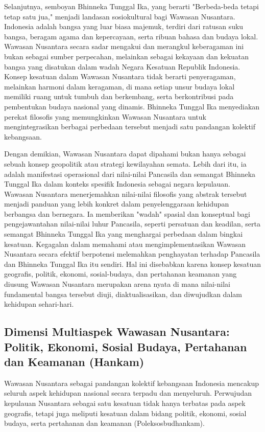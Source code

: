 \documentclass[12pt, a4paper]{article}
\begin{document}
Selanjutnya, semboyan Bhinneka Tunggal Ika, yang berarti "Berbeda-beda tetapi tetap satu jua," menjadi landasan sosiokultural bagi Wawasan Nusantara. Indonesia adalah bangsa yang luar biasa majemuk, terdiri dari ratusan suku bangsa, beragam agama dan kepercayaan, serta ribuan bahasa dan budaya lokal. Wawasan Nusantara secara sadar mengakui dan merangkul keberagaman ini bukan sebagai sumber perpecahan, melainkan sebagai kekayaan dan kekuatan bangsa yang disatukan dalam wadah Negara Kesatuan Republik Indonesia. Konsep kesatuan dalam Wawasan Nusantara tidak berarti penyeragaman, melainkan harmoni dalam keragaman, di mana setiap unsur budaya lokal memiliki ruang untuk tumbuh dan berkembang, serta berkontribusi pada pembentukan budaya nasional yang dinamis. Bhinneka Tunggal Ika menyediakan perekat filosofis yang memungkinkan Wawasan Nusantara untuk mengintegrasikan berbagai perbedaan tersebut menjadi satu pandangan kolektif kebangsaan.  

Dengan demikian, Wawasan Nusantara dapat dipahami bukan hanya sebagai sebuah konsep geopolitik atau strategi kewilayahan semata. Lebih dari itu, ia adalah manifestasi operasional dari nilai-nilai Pancasila dan semangat Bhinneka Tunggal Ika dalam konteks spesifik Indonesia sebagai negara kepulauan. Wawasan Nusantara menerjemahkan nilai-nilai filosofis yang abstrak tersebut menjadi panduan yang lebih konkret dalam penyelenggaraan kehidupan berbangsa dan bernegara. Ia memberikan "wadah" spasial dan konseptual bagi pengejawantahan nilai-nilai luhur Pancasila, seperti persatuan dan keadilan, serta semangat Bhinneka Tunggal Ika yang menghargai perbedaan dalam bingkai kesatuan. Kegagalan dalam memahami atau mengimplementasikan Wawasan Nusantara secara efektif berpotensi melemahkan penghayatan terhadap Pancasila dan Bhinneka Tunggal Ika itu sendiri. Hal ini disebabkan karena konsep kesatuan geografis, politik, ekonomi, sosial-budaya, dan pertahanan keamanan yang diusung Wawasan Nusantara merupakan arena nyata di mana nilai-nilai fundamental bangsa tersebut diuji, diaktualisasikan, dan diwujudkan dalam kehidupan sehari-hari.

\subsection*{Dimensi Multiaspek Wawasan Nusantara: Politik, Ekonomi, Sosial Budaya, Pertahanan dan Keamanan (Hankam)}

Wawasan Nusantara sebagai pandangan kolektif kebangsaan Indonesia mencakup seluruh aspek kehidupan nasional secara terpadu dan menyeluruh. Perwujudan kepulauan Nusantara sebagai satu kesatuan tidak hanya terbatas pada aspek geografis, tetapi juga meliputi kesatuan dalam bidang politik, ekonomi, sosial budaya, serta pertahanan dan keamanan (Poleksosbudhankam).  
\end{document}
